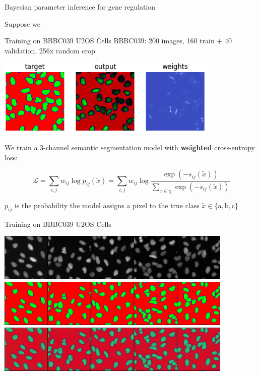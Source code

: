\documentclass[aspectratio=1610]{beamer}					%
\begin{document}
\begin{frame}{Bayesian parameter inference for gene regulation}

Suppose we 

\end{frame}

\begin{frame}{Training on BBBC039 U2OS Cells}
\vspace{0.1in}
BBBC039: 200 images, 160 train + 40 validation, 256\;x random crop

\begin{center}
\includegraphics[width=0.8\textwidth]{weights.png}
\end{center}

We train a 3-channel semantic segmentation model with \textbf{weighted} cross-entropy loss:

\begin{equation*}
\mathcal{L} = \sum_{i,j} w_{ij}\log p_{ij}(\tilde{x}) = \sum_{i,j} w_{ij}\log \frac{\exp(-s_{ij}(\tilde{x}))}{\sum_{x\in\chi} \exp(-s_{ij}(\tilde{x}))}
\end{equation*}

$p_{ij}$ is the probability the model assigns a pixel to the true class $\tilde{x} \in \{\textrm{a}, \textrm{b}, \textrm{c}\}$

\end{frame}

\begin{frame}{Training on BBBC039 U2OS Cells}

\begin{center}
\includegraphics[width=0.85\textwidth]{input-train.png}
\includegraphics[width=0.85\textwidth]{target-train.png}
\includegraphics[width=0.85\textwidth]{output-train.png}
\end{center}

\end{frame}
\end{document}
